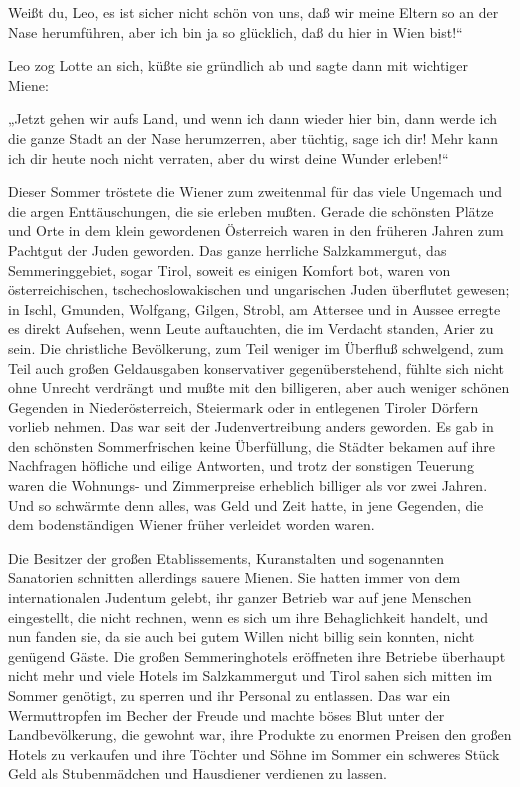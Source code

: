 Weißt du, Leo, es ist sicher nicht schön von uns, daß wir meine
Eltern so an der Nase herumführen, aber ich bin ja so glücklich,
daß du hier in Wien bist!“

Leo zog Lotte an sich, küßte sie gründlich ab und sagte dann mit
wichtiger Miene:

„Jetzt gehen wir aufs Land, und wenn ich dann wieder hier bin, dann
werde ich die ganze Stadt an der Nase herumzerren, aber tüchtig,
sage ich dir! Mehr kann  ich dir heute noch nicht
verraten, aber du wirst deine Wunder erleben!“

Dieser Sommer tröstete die Wiener zum zweitenmal für das viele
Ungemach und die argen Enttäuschungen, die sie erleben mußten.
Gerade die schönsten Plätze und Orte in dem klein gewordenen
Österreich waren in den früheren Jahren zum Pachtgut der Juden
geworden. Das ganze herrliche Salzkammergut, das Semmeringgebiet,
sogar Tirol, soweit es einigen Komfort bot, waren von
österreichischen, tschechoslowakischen und ungarischen Juden
überflutet gewesen; in Ischl, Gmunden, Wolfgang, Gilgen, Strobl, am
Attersee und in Aussee erregte es direkt Aufsehen, wenn Leute
auftauchten, die im Verdacht standen, Arier zu sein. Die
christliche Bevölkerung, zum Teil weniger im Überfluß schwelgend,
zum Teil auch großen Geldausgaben konservativer gegenüberstehend,
fühlte sich nicht ohne Unrecht verdrängt und mußte mit den
billigeren, aber auch weniger schönen Gegenden in Niederösterreich,
Steiermark oder in entlegenen Tiroler Dörfern vorlieb nehmen. Das
war seit der Judenvertreibung anders geworden. Es gab in den
schönsten Sommerfrischen keine Überfüllung, die Städter bekamen
auf ihre Nachfragen höfliche und eilige Antworten, und trotz der
sonstigen Teuerung waren die Wohnungs- und Zimmerpreise erheblich
billiger als vor zwei Jahren. Und so schwärmte denn alles, was Geld
und Zeit hatte, in jene Gegenden, die dem bodenständigen Wiener
früher verleidet worden waren.

Die Besitzer der großen Etablissements, Kuranstalten und
sogenannten Sanatorien schnitten allerdings sauere 
Mienen. Sie hatten immer von dem internationalen Judentum gelebt,
ihr ganzer Betrieb war auf jene Menschen eingestellt, die nicht
rechnen, wenn es sich um ihre Behaglichkeit handelt, und nun fanden
sie, da sie auch bei gutem Willen nicht billig sein konnten, nicht
genügend Gäste. Die großen Semmeringhotels eröffneten ihre Betriebe
überhaupt nicht mehr und viele Hotels im Salzkammergut und Tirol
sahen sich mitten im Sommer genötigt, zu sperren und ihr Personal
zu entlassen. Das war ein Wermuttropfen im Becher der Freude und
machte böses Blut unter der Landbevölkerung, die gewohnt war, ihre
Produkte zu enormen Preisen den großen Hotels zu verkaufen und ihre
Töchter und Söhne im Sommer ein schweres Stück Geld als
Stubenmädchen und Hausdiener verdienen zu lassen.

